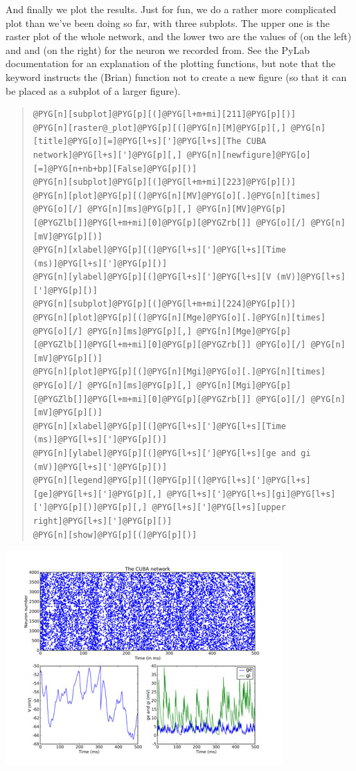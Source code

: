 \documentclass[letterpaper,10pt,english]{manual}
\begin{document}
And finally we plot the results. Just for fun, we do a rather more
complicated plot than we've been doing so far, with three subplots.
The upper one is the raster plot of the whole network, and the
lower two are the values of  (on the left) and  and  (on the
right) for the neuron we recorded from. See the PyLab documentation
for an explanation of the plotting functions, but note that the
\hyperlink{brian.raster_plot}{} keyword  instructs the (Brian) function
\hyperlink{brian.raster_plot}{} not to create a new figure (so that it can be placed
as a subplot of a larger figure).
\begin{quote}

\begin{Verbatim}[commandchars=@\[\]]
@PYG[n][subplot]@PYG[p][(]@PYG[l+m+mi][211]@PYG[p][)]
@PYG[n][raster@_plot]@PYG[p][(]@PYG[n][M]@PYG[p][,] @PYG[n][title]@PYG[o][=]@PYG[l+s][']@PYG[l+s][The CUBA network]@PYG[l+s][']@PYG[p][,] @PYG[n][newfigure]@PYG[o][=]@PYG[n+nb+bp][False]@PYG[p][)]
@PYG[n][subplot]@PYG[p][(]@PYG[l+m+mi][223]@PYG[p][)]
@PYG[n][plot]@PYG[p][(]@PYG[n][MV]@PYG[o][.]@PYG[n][times] @PYG[o][/] @PYG[n][ms]@PYG[p][,] @PYG[n][MV]@PYG[p][@PYGZlb[]]@PYG[l+m+mi][0]@PYG[p][@PYGZrb[]] @PYG[o][/] @PYG[n][mV]@PYG[p][)]
@PYG[n][xlabel]@PYG[p][(]@PYG[l+s][']@PYG[l+s][Time (ms)]@PYG[l+s][']@PYG[p][)]
@PYG[n][ylabel]@PYG[p][(]@PYG[l+s][']@PYG[l+s][V (mV)]@PYG[l+s][']@PYG[p][)]
@PYG[n][subplot]@PYG[p][(]@PYG[l+m+mi][224]@PYG[p][)]
@PYG[n][plot]@PYG[p][(]@PYG[n][Mge]@PYG[o][.]@PYG[n][times] @PYG[o][/] @PYG[n][ms]@PYG[p][,] @PYG[n][Mge]@PYG[p][@PYGZlb[]]@PYG[l+m+mi][0]@PYG[p][@PYGZrb[]] @PYG[o][/] @PYG[n][mV]@PYG[p][)]
@PYG[n][plot]@PYG[p][(]@PYG[n][Mgi]@PYG[o][.]@PYG[n][times] @PYG[o][/] @PYG[n][ms]@PYG[p][,] @PYG[n][Mgi]@PYG[p][@PYGZlb[]]@PYG[l+m+mi][0]@PYG[p][@PYGZrb[]] @PYG[o][/] @PYG[n][mV]@PYG[p][)]
@PYG[n][xlabel]@PYG[p][(]@PYG[l+s][']@PYG[l+s][Time (ms)]@PYG[l+s][']@PYG[p][)]
@PYG[n][ylabel]@PYG[p][(]@PYG[l+s][']@PYG[l+s][ge and gi (mV)]@PYG[l+s][']@PYG[p][)]
@PYG[n][legend]@PYG[p][(]@PYG[p][(]@PYG[l+s][']@PYG[l+s][ge]@PYG[l+s][']@PYG[p][,] @PYG[l+s][']@PYG[l+s][gi]@PYG[l+s][']@PYG[p][)]@PYG[p][,] @PYG[l+s][']@PYG[l+s][upper right]@PYG[l+s][']@PYG[p][)]
@PYG[n][show]@PYG[p][(]@PYG[p][)]
\end{Verbatim}
\end{quote}

\includegraphics{2c.jpg}
\end{document}
